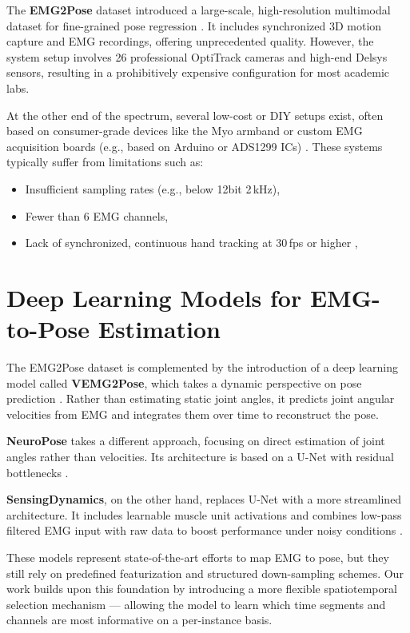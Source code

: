 The \textbf{EMG2Pose} dataset introduced a large-scale, high-resolution multimodal dataset for fine-grained pose regression \cite{salter2024emg2pose}. It includes synchronized 3D motion capture and EMG recordings, offering unprecedented quality. However, the system setup involves 26 professional OptiTrack cameras and high-end Delsys sensors, resulting in a prohibitively expensive configuration for most academic labs.

At the other end of the spectrum, several low-cost or DIY setups exist, often based on consumer-grade devices like the Myo armband or custom EMG acquisition boards (e.g., based on Arduino or ADS1299 ICs) \cite{nasri2020semg}. These systems typically suffer from limitations such as:
\begin{itemize}
    \item Insufficient sampling rates (e.g., below 12bit 2\,kHz),
    \item Fewer than 6 EMG channels,
    \item Lack of synchronized, continuous hand tracking at 30\,fps or higher \cite{graf2023combining},
\end{itemize}

\section{Deep Learning Models for EMG-to-Pose Estimation}

The EMG2Pose dataset is complemented by the introduction of a deep learning model called \textbf{VEMG2Pose}, which takes a dynamic perspective on pose prediction \cite{salter2024emg2pose}. Rather than estimating static joint angles, it predicts joint angular velocities from EMG and integrates them over time to reconstruct the pose.

\textbf{NeuroPose} takes a different approach, focusing on direct estimation of joint angles rather than velocities. Its architecture is based on a U-Net with residual bottlenecks \cite{lee2022explainable}.

\textbf{SensingDynamics}, on the other hand, replaces U-Net with a more streamlined architecture. It includes learnable muscle unit activations and combines low-pass filtered EMG input with raw data to boost performance under noisy conditions \cite{zanghieri2023semg}.

These models represent state-of-the-art efforts to map EMG to pose, but they still rely on predefined featurization and structured down-sampling schemes. Our work builds upon this foundation by introducing a more flexible spatiotemporal selection mechanism — allowing the model to learn which time segments and channels are most informative on a per-instance basis.

